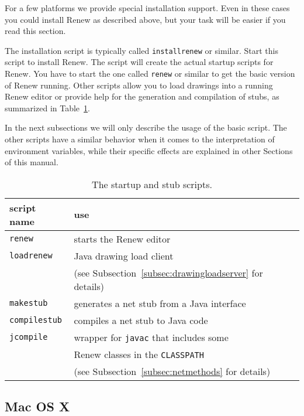 For a few platforms we provide special installation support.
Even in these cases you could install Renew as described above,
but your task will be easier if you read this section.

The installation script is typically called
\texttt{installrenew} or similar. Start this script to install
Renew. The script will create the actual startup scripts
for Renew. You have to start the one called \texttt{renew} or similar
to get the basic version of Renew running. 
Other scripts allow you to load drawings into a running Renew editor or
provide help for the generation and compilation of stubs, as summarized in
Table~\ref{tab:startupmodes}.

In the next subsections we will only describe the usage of the
basic script.
The other scripts have a similar behavior when it comes to the
interpretation of environment variables, while their specific effects are
explained in other Sections of this manual.

\begin{table}[h!]
  \begin{center}
    \begin{tabular}{l|l}
      script name & use \\
      \hline
      \texttt{renew} & starts the Renew editor \\
      \hline
      \texttt{loadrenew} & Java drawing load client \\
                         & (see Subsection~\ref{subsec:drawingloadserver}
                         for details) \\
      \hline
      \texttt{makestub} & generates a net stub from a Java interface \\
      \texttt{compilestub} & compiles a net stub to Java code \\
      \texttt{jcompile} & wrapper for \texttt{javac} that includes some \\
                        & Renew classes in the \texttt{CLASSPATH}\\
                        & (see Subsection~\ref{subsec:netmethods} for
                        details) \\
    \end{tabular}
  \end{center}
  \caption{The startup and stub scripts.}\label{tab:startupmodes}
\end{table}


\subsection{Mac OS X}\label{subsec:applemac}


